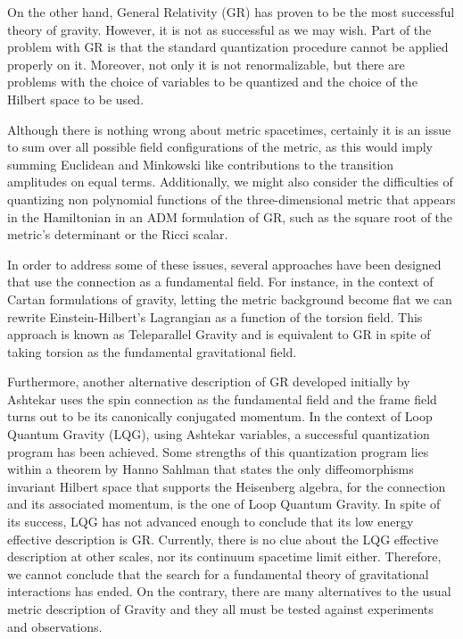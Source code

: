 \documentclass[twocolumn,
  showpacs,showkeys,prd,superscriptaddress]{revtex4-1}
\begin{document}
On the other hand, General Relativity (GR) has proven to be the most successful theory of gravity.  However,  it is not as successful as we may wish. Part of the problem with GR is that the standard quantization procedure cannot be applied  properly on it. Moreover, not only it is not renormalizable, but there are  problems with the choice of variables to be quantized and the choice of the Hilbert space to be used. 

Although there is nothing wrong about metric spacetimes,  certainly it is an issue to sum over all possible field configurations of the metric, as this would imply summing Euclidean and Minkowski like contributions to the transition amplitudes on equal terms. Additionally, we might also consider the difficulties of  quantizing  non polynomial functions of the three-dimensional metric that appears in the Hamiltonian in an ADM formulation of GR, such as the square root of the metric's determinant or the Ricci scalar.

In order to address some of these issues, several approaches have been designed that use the connection as a fundamental field. For instance, in the context of Cartan formulations of gravity, letting the metric background become flat we can rewrite Einstein-Hilbert's Lagrangian as a function of the torsion field. This approach is known as Teleparallel Gravity and is equivalent to GR in spite of taking torsion as the fundamental gravitational field.

Furthermore, another alternative description of GR developed initially by Ashtekar uses the spin connection as the fundamental field and the frame field turns out to be its canonically conjugated momentum. In the context of Loop Quantum Gravity (LQG), using Ashtekar variables, a successful quantization program has been achieved. Some  strengths of this quantization program lies within a theorem by Hanno Sahlman that states the only diffeomorphisms invariant Hilbert space that supports the Heisenberg algebra, for the connection and its associated momentum, is the one of Loop Quantum Gravity. In spite of its success, LQG has not advanced enough to conclude that its low energy effective description is GR. Currently, there is no clue about the LQG effective description at other scales,  nor its continuum spacetime limit either. Therefore, we cannot conclude that the search for a fundamental theory of gravitational interactions has ended. On the contrary, there are many alternatives to the usual metric description of Gravity and they all must be tested against experiments and observations.
\end{document}
